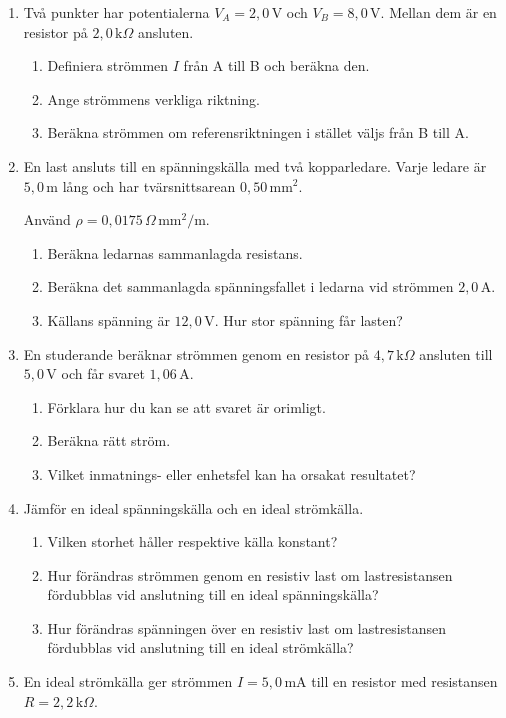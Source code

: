 \documentclass[
  swedish,
  11pt,
  a4paper,
  DIV=11,
  numbers=noendperiod,
  twoside,
  open=any]{scrreprt}
\begin{document}
\begin{enumerate}
\def\labelenumi{\arabic{enumi}.}
\setcounter{enumi}{19}
\item
  Två punkter har potentialerna \(V_A = 2{,}0\,\mathrm{V}\) och
  \(V_B = 8{,}0\,\mathrm{V}\). Mellan dem är en resistor på
  \(2{,}0\,\mathrm{k}\Omega\) ansluten.

  \begin{enumerate}
  \def\labelenumii{\alph{enumii}.}
  \item
    Definiera strömmen \(I\) från A till B och beräkna den.
  \item
    Ange strömmens verkliga riktning.
  \item
    Beräkna strömmen om referensriktningen i stället väljs från B till
    A.
  \end{enumerate}
\item
  En last ansluts till en spänningskälla med två kopparledare. Varje
  ledare är \(5{,}0\,\mathrm{m}\) lång och har tvärsnittsarean
  \(0{,}50\,\mathrm{mm^2}\).

  Använd \(\rho = 0{,}0175\,\Omega\,\mathrm{mm^2/m}\).

  \begin{enumerate}
  \def\labelenumii{\alph{enumii}.}
  \item
    Beräkna ledarnas sammanlagda resistans.
  \item
    Beräkna det sammanlagda spänningsfallet i ledarna vid strömmen
    \(2{,}0\,\mathrm{A}\).
  \item
    Källans spänning är \(12{,}0\,\mathrm{V}\). Hur stor spänning får
    lasten?
  \end{enumerate}
\item
  En studerande beräknar strömmen genom en resistor på
  \(4{,}7\,\mathrm{k}\Omega\) ansluten till \(5{,}0\,\mathrm{V}\) och
  får svaret \(1{,}06\,\mathrm{A}\).

  \begin{enumerate}
  \def\labelenumii{\alph{enumii}.}
  \item
    Förklara hur du kan se att svaret är orimligt.
  \item
    Beräkna rätt ström.
  \item
    Vilket inmatnings- eller enhetsfel kan ha orsakat resultatet?
  \end{enumerate}
\item
  Jämför en ideal spänningskälla och en ideal strömkälla.

  \begin{enumerate}
  \def\labelenumii{\alph{enumii}.}
  \item
    Vilken storhet håller respektive källa konstant?
  \item
    Hur förändras strömmen genom en resistiv last om lastresistansen
    fördubblas vid anslutning till en ideal spänningskälla?
  \item
    Hur förändras spänningen över en resistiv last om lastresistansen
    fördubblas vid anslutning till en ideal strömkälla?
  \end{enumerate}
\item
  En ideal strömkälla ger strömmen \(I = 5{,}0\,\mathrm{mA}\) till en
  resistor med resistansen \(R = 2{,}2\,\mathrm{k}\Omega\).


\end{enumerate}
\end{document}
